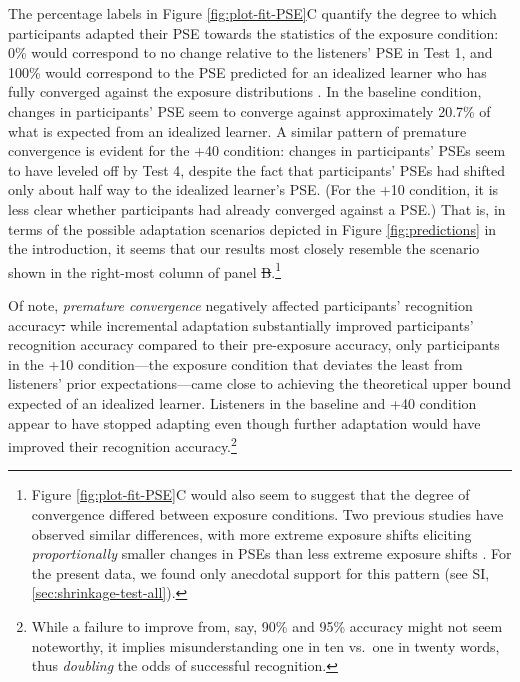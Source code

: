 \documentclass[
  11pt,
  man,mask,floatsintext]{apa6}
\makeatletter
\providecommand{\DIFadd}[1]{{\protect\color{blue}\uwave{#1}}} %
\providecommand{\DIFdel}[1]{{\protect\color{red}\sout{#1}}} %
\providecommand{\DIFaddbegin}{} %
\providecommand{\DIFaddend}{} %
\providecommand{\DIFdelbegin}{} %
\providecommand{\DIFdelend}{} %
\newcommand{\DIFscaledelfig}{0.5}
\newlength{\DIFdelgraphicswidth} %
\newlength{\DIFdelgraphicsheight} %
\newcommand{\DIFaddincludegraphics}[2][]{{\color{blue}\fbox{\DIFOincludegraphics[#1]{#2}}}} %
\newcommand{\DIFdelincludegraphics}[2][]{%
\sbox{\DIFdelgraphicsbox}{\DIFOincludegraphics[#1]{#2}}%
\settoboxwidth{\DIFdelgraphicswidth}{\DIFdelgraphicsbox} %
\settoboxtotalheight{\DIFdelgraphicsheight}{\DIFdelgraphicsbox} %
\scalebox{\DIFscaledelfig}{%
\parbox[b]{\DIFdelgraphicswidth}{\usebox{\DIFdelgraphicsbox}\\[-\baselineskip] \rule{\DIFdelgraphicswidth}{0em}}\llap{\resizebox{\DIFdelgraphicswidth}{\DIFdelgraphicsheight}{%
\setlength{\unitlength}{\DIFdelgraphicswidth}%
\begin{picture}(1,1)%
\thicklines\linethickness{2pt} %
{\color[rgb]{1,0,0}\put(0,0){\framebox(1,1){}}}%
{\color[rgb]{1,0,0}\put(0,0){\line( 1,1){1}}}%
{\color[rgb]{1,0,0}\put(0,1){\line(1,-1){1}}}%
\end{picture}%
}\hspace*{3pt}}} %
} %
\DeclareRobustCommand{\DIFaddbegin}{\DIFOaddbegin \let\includegraphics\DIFaddincludegraphics} %
\DeclareRobustCommand{\DIFaddend}{\DIFOaddend \let\includegraphics\DIFOincludegraphics} %
\DeclareRobustCommand{\DIFdelbegin}{\DIFOdelbegin \let\includegraphics\DIFdelincludegraphics} %
\DeclareRobustCommand{\DIFdelend}{\DIFOaddend \let\includegraphics\DIFOincludegraphics} %
\let\sout@orig\sout %
\renewcommand{\sout}[1]{\ifmmode\text{\sout@orig{\ensuremath{#1}}}\else\sout@orig{#1}\fi} %
\makeatother
\begin{document}
The percentage labels in Figure \ref{fig:plot-fit-PSE}C quantify the degree to which participants adapted their PSE towards the statistics of the exposure condition: 0\% would correspond to no change relative to the listeners' PSE in Test 1, and 100\% would correspond to the PSE predicted for an idealized learner who has fully converged against the exposure distributions \DIFaddbegin \DIFadd{(see Methods)}\DIFaddend . In the baseline condition, changes in participants' PSE seem to converge against approximately 20.7\% of what is expected from an idealized learner. A similar pattern of premature convergence is evident for the +40 condition: changes in participants' PSEs seem to have leveled off by Test 4, despite the fact that participants' PSEs had shifted only about half way to the idealized learner's PSE. (For the +10 condition, it is less clear whether participants had already converged against a PSE.) That is, in terms of the possible adaptation scenarios depicted in Figure \ref{fig:predictions} in the introduction, it seems that our results most closely resemble the scenario shown in the right-most column of panel \DIFdelbegin \DIFdel{B}\DIFdelend \DIFaddbegin \DIFadd{D}\DIFaddend .\footnote{Figure \ref{fig:plot-fit-PSE}C would also seem to suggest that the degree of convergence differed between exposure conditions. Two previous studies have observed similar differences, with more extreme exposure shifts eliciting \emph{proportionally} smaller changes in PSEs than less extreme exposure shifts \autocite{kleinschmidt-jaeger2016,kleinschmidt2020}. For the present data, we found only anecdotal support for this pattern (see SI, \ref{sec:shrinkage-test-all}).}

Of note, \emph{premature convergence} negatively affected participants' recognition accuracy\DIFdelbegin \DIFdel{: }\DIFdelend \DIFaddbegin \DIFadd{. As shown in Figure \ref{fig:IO-human-accuracy} }\DIFaddend while incremental adaptation substantially improved participants' recognition accuracy compared to their pre-exposure accuracy, only participants in the +10 condition---the exposure condition that deviates the least from listeners' prior expectations---came close to achieving the theoretical upper bound expected of an idealized learner. Listeners in the baseline and +40 condition appear to have stopped adapting even though further adaptation would have improved their recognition accuracy.\footnote{While a failure to improve from, say, 90\% and 95\% accuracy might not seem noteworthy, it implies misunderstanding one in ten vs.~one in twenty words, thus \emph{doubling} the odds of successful recognition.}
\end{document}
